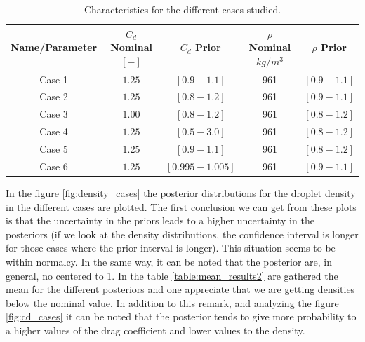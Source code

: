 \documentclass{article}
\begin{document}
\begin{table}[H]
\centering
 \begin{tabular}{||c| c | c | c | c ||}

 \hline
 \textbf{Name/Parameter} & \textbf{ $C_d$ Nominal $[-]$} & \textbf{$C_d$ Prior} & \textbf{$\rho$ Nominal $kg/m^3$} & \textbf{$\rho$ Prior}\\ [0.5ex] 
 \hline
 Case 1 &  $1.25$ & $[0.9-1.1]$ & 961 & $[0.9-1.1]$ \\  [0.5ex] 
 \hline
 Case 2& $1.25$ &$[0.8-1.2]$ & 961 & $[0.9-1.1]$ \\  [0.5ex] 
 \hline
 Case 3 & $1.00$ & $[0.8-1.2]$ & 961 & $ [0.8-1.2]$ \\ [0.5ex] 
 \hline
 Case 4 & $1.25$ & $[0.5-3.0]$ & 961 & $[0.8-1.2]$ \\ [0.5ex] 
 \hline
 Case 5 & $1.25$ & $[0.9-1.1]$& 961 & $ [0.8-1.2]$\\ [0.5ex] 
 \hline
 Case 6& $1.25$ & $[0.995-1.005]$& 961 & $[0.9-1.1]$ \\ [0.5ex] 
 \hline
\end{tabular}
\caption{Characteristics for the different cases studied.}
\label{table:cases_studied2}
\end{table}

In the figure \ref{fig:density_cases} the posterior distributions for the droplet density in the different cases are plotted. The first conclusion we can get from these plots is that the uncertainty in the priors leads to a higher uncertainty in the posteriors (if we look at the density distributions, the confidence interval is longer for those cases where the prior interval is longer). This situation seems to be within normalcy.  In the same way, it can be noted that the posterior are, in general, no centered to 1. In the table \ref{table:mean_results2} are gathered the mean for the different posteriors and one appreciate that we are getting densities below the nominal value. In addition to this remark,  and analyzing  the figure \ref{fig:cd_cases} it can be noted  that the posterior tends to give more probability to a higher values of the drag coefficient and lower values to the density.
\end{document}
